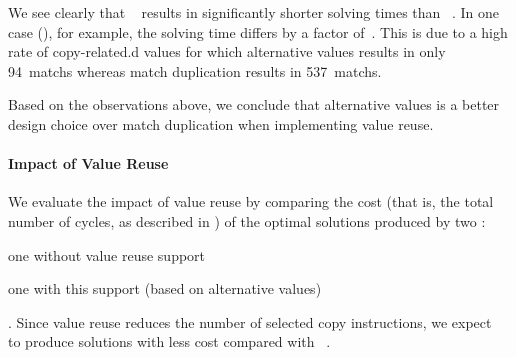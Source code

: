 We see clearly that ~ results in
significantly shorter solving times than ~.
%
In one case (), for example, the solving time differs by a
factor
of~\printSpeedup{%
  \AltValuesVsMatchDupPrePlusSolvingTimeSpeedupPrePlusSolvingTimeRegularSpeedupMax%
}.
%
This is due to a high rate of \gls{copy-related.d} values for which
\glspl{alternative value} results in only \num{94}~\glspl{match} whereas
\gls{match duplication} results in \num{537}~\glspl{match}.

Based on the observations above, we conclude that \glspl{alternative value} is a
better design choice over \gls{match duplication} when implementing \gls{value
  reuse}.


\paragraph{Impact of Value Reuse}

We evaluate the impact of \gls{value reuse} by comparing the cost (that is, the
total number of cycles, as described in ) of
the optimal \glspl{solution} produced by two :
%
\begin{modelList}
  \item {}
    one without \gls{value reuse} support
  \item {}
    one with this support (based on \glspl{alternative value})
\end{modelList}.
%
Since \gls{value reuse} reduces the number of selected copy \glspl{instruction},
we expect ~ to produce
\glspl{solution} with less cost compared with ~.




